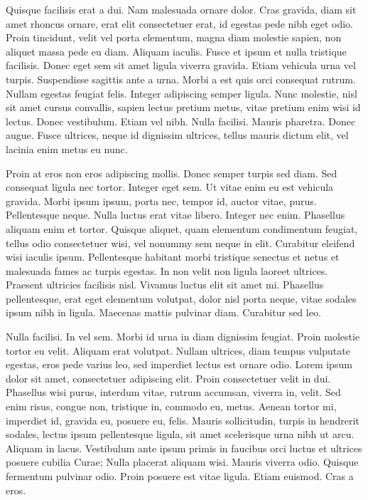 Quisque facilisis erat a dui. Nam malesuada ornare dolor. Cras gravida, diam
sit amet rhoncus ornare, erat elit consectetuer erat, id egestas pede nibh eget
odio. Proin tincidunt, velit vel porta elementum, magna diam molestie sapien,
non aliquet massa pede eu diam. Aliquam iaculis. Fusce et ipsum et nulla
tristique facilisis. Donec eget sem sit amet ligula viverra gravida. Etiam
vehicula urna vel turpis. Suspendisse sagittis ante a urna. Morbi a est quis
orci consequat rutrum. Nullam egestas feugiat felis. Integer adipiscing semper
ligula. Nunc molestie, nisl sit amet cursus convallis, sapien lectus pretium
metus, vitae pretium enim wisi id lectus. Donec vestibulum. Etiam vel nibh.
Nulla facilisi. Mauris pharetra. Donec augue. Fusce ultrices, neque id
dignissim ultrices, tellus mauris dictum elit, vel lacinia enim metus eu nunc.

Proin at eros non eros adipiscing mollis. Donec semper turpis sed diam. Sed
consequat ligula nec tortor. Integer eget sem. Ut vitae enim eu est vehicula
gravida. Morbi ipsum ipsum, porta nec, tempor id, auctor vitae, purus.
Pellentesque neque. Nulla luctus erat vitae libero. Integer nec enim. Phasellus
aliquam enim et tortor. Quisque aliquet, quam elementum condimentum feugiat,
tellus odio consectetuer wisi, vel nonummy sem neque in elit. Curabitur
eleifend wisi iaculis ipsum. Pellentesque habitant morbi tristique senectus et
netus et malesuada fames ac turpis egestas. In non velit non ligula laoreet
ultrices. Praesent ultricies facilisis nisl. Vivamus luctus elit sit amet mi.
Phasellus pellentesque, erat eget elementum volutpat, dolor nisl porta neque,
vitae sodales ipsum nibh in ligula. Maecenas mattis pulvinar diam. Curabitur
sed leo.

Nulla facilisi. In vel sem. Morbi id urna in diam dignissim feugiat. Proin
molestie tortor eu velit. Aliquam erat volutpat. Nullam ultrices, diam tempus
vulputate egestas, eros pede varius leo, sed imperdiet lectus est ornare odio.
Lorem ipsum dolor sit amet, consectetuer adipiscing elit. Proin consectetuer
velit in dui. Phasellus wisi purus, interdum vitae, rutrum accumsan, viverra
in, velit. Sed enim risus, congue non, tristique in, commodo eu, metus. Aenean
tortor mi, imperdiet id, gravida eu, posuere eu, felis. Mauris sollicitudin,
turpis in hendrerit sodales, lectus ipsum pellentesque ligula, sit amet
scelerisque urna nibh ut arcu. Aliquam in lacus. Vestibulum ante ipsum primis
in faucibus orci luctus et ultrices posuere cubilia Curae; Nulla placerat
aliquam wisi. Mauris viverra odio. Quisque fermentum pulvinar odio. Proin
posuere est vitae ligula. Etiam euismod. Cras a eros.

